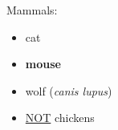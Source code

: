 \documentclass{article}
\begin{document}
\fontsize{40}{40}\selectfont 

Mammals:
\begin{itemize}
\item cat
\item \textbf{mouse}
\item wolf (\emph{canis lupus})
\item \underline{NOT} chickens
\end{itemize}
\end{document}
